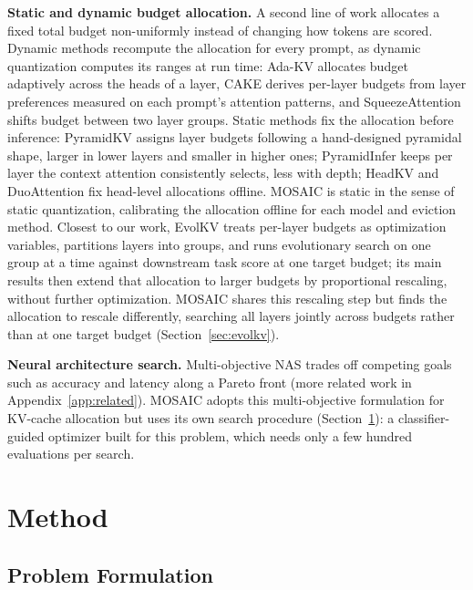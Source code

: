 \documentclass[11pt]{article}
\begin{document}
\textbf{Static and dynamic budget allocation.} A second line of work allocates a fixed total budget non-uniformly instead of changing how tokens are scored. Dynamic methods recompute the allocation for every prompt, as dynamic quantization computes its ranges at run time: Ada-KV \citep{feng2025adakv} allocates budget adaptively across the heads of a layer, CAKE \citep{qin2025cake} derives per-layer budgets from layer preferences measured on each prompt's attention patterns, and SqueezeAttention \citep{wang2025squeezeattention} shifts budget between two layer groups. Static methods fix the allocation before inference: PyramidKV \citep{cai2025pyramidkv} assigns layer budgets following a hand-designed pyramidal shape, larger in lower layers and smaller in higher ones; PyramidInfer \citep{yang2024pyramidinfer} keeps per layer the context attention consistently selects, less with depth; HeadKV \citep{fu2025headkv} and DuoAttention \citep{xiao2025duoattention} fix head-level allocations offline. MOSAIC is static in the sense of static quantization, calibrating the allocation offline for each model and eviction method. Closest to our work, EvolKV \citep{yu2025evolkv} treats per-layer budgets as optimization variables, partitions layers into groups, and runs evolutionary search on one group at a time against downstream task score at one target budget; its main results then extend that allocation to larger budgets by proportional rescaling, without further optimization. MOSAIC shares this rescaling step but finds the allocation to rescale differently, searching all layers jointly across budgets rather than at one target budget (Section~\ref{sec:evolkv}).

\textbf{Neural architecture search.} Multi-objective NAS trades off competing goals such as accuracy and latency along a Pareto front \citep{elsken2018neural} (more related work in Appendix~\ref{app:related}). MOSAIC adopts this multi-objective formulation for KV-cache allocation but uses its own search procedure (Section~\ref{sec:method}): a classifier-guided optimizer built for this problem, which needs only a few hundred evaluations per search.

\section{Method}
\label{sec:method}

\subsection{Problem Formulation}
\label{sec:formulation}
\end{document}
